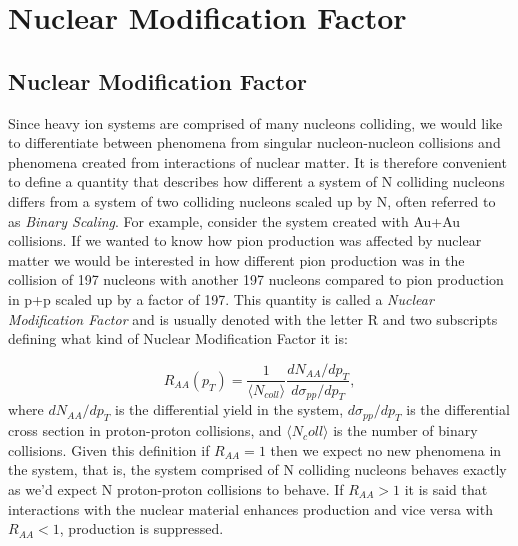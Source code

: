 \chapter{Nuclear Modification Factor} %
\label{nuclmodfactapp}

\section{Nuclear Modification Factor}
Since heavy ion systems are comprised of many nucleons colliding, we would like to differentiate between phenomena from singular nucleon-nucleon collisions and phenomena created from interactions of nuclear matter. It is therefore convenient to define a quantity that describes how different a system of N colliding nucleons differs from a system of two colliding nucleons scaled up by N, often referred to as \textit{Binary Scaling}. For example, consider the system created with Au+Au collisions. If we wanted to know how pion production was affected by nuclear matter we would be interested in how different pion production was in the collision of 197 nucleons with another 197 nucleons compared to pion production in p+p scaled up by a factor of 197. This quantity is called a \textit{Nuclear Modification Factor} and is usually denoted with the letter R and two subscripts defining what kind of Nuclear Modification Factor it is:

\begin{equation}
R_{AA}(p_{T}) = \frac{1}{\langle N_{coll} \rangle} \frac{dN_{AA}/dp_{T}}{d\sigma_{pp}/dp_{T}},
\end{equation}
where $dN_{AA}/dp_{T}$ is the differential yield in the system, $d\sigma_{pp}/dp_{T}$ is the differential cross section in proton-proton collisions, and $\langle N_coll \rangle$ is the number of binary collisions. Given this definition if $R_{AA}=1$ then we expect no new phenomena in the system, that is, the system comprised of N colliding nucleons behaves exactly as we'd expect N proton-proton collisions to behave. If $R_{AA}>1$ it is said that interactions with the nuclear material enhances production and vice versa with $R_{AA}<1$, production is suppressed.